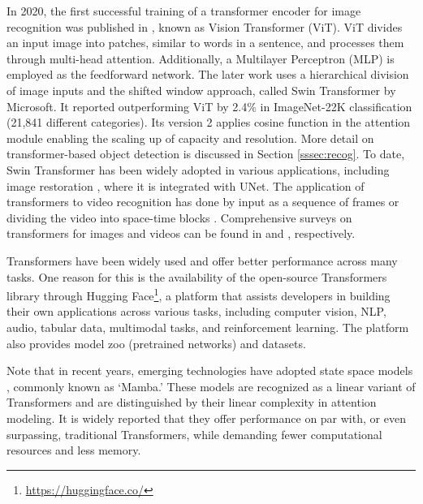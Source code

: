 \documentclass[11pt,a4paper]{article}
\begin{document}
In 2020, the first successful training of a transformer encoder for image recognition was published in \cite{Dosovitskiy:image:2021}, known as Vision Transformer (ViT). ViT divides an input image into patches, similar to words in a sentence, and processes them through multi-head attention. Additionally, a Multilayer Perceptron (MLP) is employed as the feedforward network. The later work uses a hierarchical division of image inputs and the shifted window approach, called Swin Transformer \cite{Liu:Swin:2021} by Microsoft. It reported outperforming ViT by 2.4\% in ImageNet-22K classification (21,841 different categories). Its version 2 \cite{Liu:Swinv2:2022} applies cosine function in the attention module enabling the scaling up of capacity and resolution. More detail on transformer-based object detection is discussed in Section \ref{sssec:recog}. To date, Swin Transformer has been widely adopted in various applications, including image restoration \cite{Fan:SUNet:2022}, where it is integrated with UNet. The application of transformers to video recognition has done by input as a sequence of frames  \cite{Neimark:video:2021} or dividing the video into space-time blocks \cite{Bertasius:Is:2021}.  Comprehensive surveys on transformers for images and videos can be found in \cite{Khan:Transformers:2022} and \cite{Selva:video:2023}, respectively.
 
Transformers have been widely used and offer better performance across many tasks. One reason for this is the availability of the open-source Transformers library through Hugging  Face\footnote{\url{https://huggingface.co/}}, a platform that assists developers in building their own applications across various tasks, including computer vision, NLP, audio, tabular data, multimodal tasks, and reinforcement learning. The platform also provides model zoo (pretrained networks) and datasets. 

Note that in recent years, emerging technologies have adopted state space models \cite{gu2023mamba, zhu2024vision}, commonly known as `Mamba.' These models are recognized as a linear variant of Transformers and are distinguished by their linear complexity in attention modeling. It is widely reported that they offer performance on par with, or even surpassing, traditional Transformers, while demanding fewer computational resources and less memory.
\end{document}
